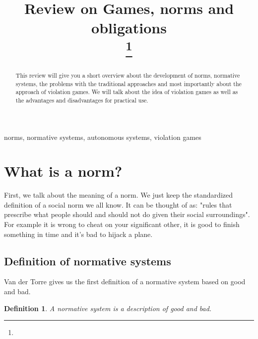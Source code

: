 \documentclass[conference]{hehe}
\newtheorem{definition}{Definition}
\begin{document}
\title{Review on Games, norms and obligations
\\
{\footnotesize \textsuperscript{}}
\thanks{}
}

\author{
\and
{}

}

\maketitle

\begin{abstract}
This review will give you a short overview about the development of norms, normative systems, the problems with the traditional approaches and most importantly about the approach of violation games. We will talk about the idea of violation games as well as the advantages and disadvantages for practical use.
\end{abstract}

\begin{IEEEkeywords}
norms, normative systems, autonomous systems, violation games
\end{IEEEkeywords}

\section{What is a norm?}

First, we talk about the meaning of a norm. We just keep the standardized definition of a social norm we all know. It can be thought of as: "rules that prescribe what people should and should not do given their social surroundings"\cite{b1}. For example it is wrong to cheat on your significant other, it is good to finish something in time and it's bad to hijack a plane.
\subsection{Definition of normative systems}
Van der Torre gives us the first definition of a normative system based on good and bad.\\

\begin{definition}
A normative system is a description of good and
bad. \cite{b2}
\end{definition}
\end{document}
